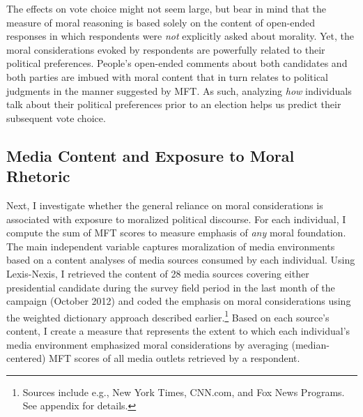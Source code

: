 \documentclass[12pt]{article}
\begin{document}
The effects on vote choice might not seem large, but bear in mind that the measure of moral reasoning is based solely on the content of open-ended responses in which respondents were \textit{not} explicitly asked about morality. Yet, the moral considerations evoked by respondents are powerfully related to their political preferences. People's open-ended comments about both candidates and both parties are imbued with moral content that in turn relates to political judgments in the manner suggested by MFT. As such, analyzing \textit{how} individuals talk about their political preferences prior to an election helps us predict their subsequent vote choice.


\subsection*{Media Content and Exposure to Moral Rhetoric}

Next, I investigate whether the general reliance on moral considerations is associated with exposure to moralized political discourse. For each individual, I compute the sum of MFT scores to measure emphasis of \textit{any} moral foundation. The main independent variable captures moralization of media environments based on a content analyses of media sources consumed by each individual. Using Lexis-Nexis, I retrieved the content of 28 media sources covering either presidential candidate during the survey field period in the last month of the campaign (October 2012) and coded the emphasis on moral considerations using the weighted dictionary approach described earlier.\footnote{Sources include e.g., New York Times, CNN.com, and Fox News Programs. See appendix for details.} Based on each source's content, I create a measure that represents the extent to which each individual's media environment emphasized moral considerations by averaging (median-centered) MFT scores of all media outlets retrieved by a respondent.
\end{document}
